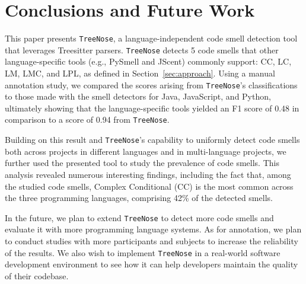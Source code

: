 \section{Conclusions and Future Work}






This paper presents \texttt{TreeNose}, a language-independent code smell
detection tool that leverages Treesitter parsers. \texttt{TreeNose} detects 5
code smells that other language-specific tools (e.g., PySmell and JScent)
commonly support: CC, LC, LM, LMC, and LPL, as defined in
Section~\ref{sec:approach}.
%
Using a manual annotation study, we compared the scores arising from
\texttt{TreeNose}'s classifications to those made with the smell detectors for
Java, JavaScript, and Python,
%
ultimately showing that the language-specific tools yielded an F1 score of 0.48
in comparison to a score of 0.94 from \texttt{TreeNose}.

Building on this result and \texttt{TreeNose}'s capability to uniformly detect
code smells both across projects in different languages and in multi-language
projects, we further used the presented tool to study the prevalence of code
smells.
%
This analysis revealed numerous interesting findings, including the fact that,
among the studied code smells, Complex Conditional (CC) is the most common
across the three programming languages, comprising 42\% of the detected smells.


In the future, we plan to extend \texttt{TreeNose} to detect more code smells
and evaluate it with more programming language systems. As for annotation, we
plan to conduct studies with more participants and subjects to increase the
reliability of the results. We also wish to implement \texttt{TreeNose} in a
real-world software development environment to see how it can help developers
maintain the quality of their codebase.
